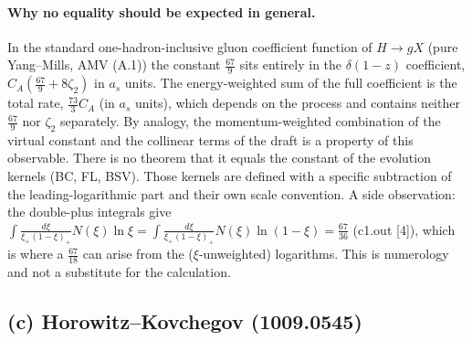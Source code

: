 \paragraph{Why no equality should be expected in general.} In the standard one-hadron-inclusive gluon coefficient function of $H\to gX$ (pure Yang--Mills, AMV (A.1)) the constant $\frac{67}{9}$ sits entirely in the $\delta(1-z)$ coefficient, $C_A(\frac{67}{9}+8\zeta_2)$ in $a_s$ units. The energy-weighted sum of the full coefficient is the total rate, $\frac{73}{3}C_A$ (in $a_s$ units), which depends on the process and contains neither $\frac{67}{9}$ nor $\zeta_2$ separately. By analogy, the momentum-weighted combination of the virtual constant and the collinear terms of the draft is a property of this observable. There is no theorem that it equals the constant of the evolution kernels (BC, FL, BSV). Those kernels are defined with a specific subtraction of the leading-logarithmic part and their own scale convention. A side observation: the double-plus integrals give $\int\frac{d\xi}{\xi_+(1-\xi)_+}N(\xi)\ln\xi=\int\frac{d\xi}{\xi_+(1-\xi)_+}N(\xi)\ln(1-\xi)=\frac{67}{36}$ (c1.out [4]), which is where a $\frac{67}{18}$ can arise from the ($\xi$-unweighted) logarithms. This is numerology and not a substitute for the calculation.

\subsection{(c) Horowitz--Kovchegov (1009.0545)}\label{sec:c-c}

